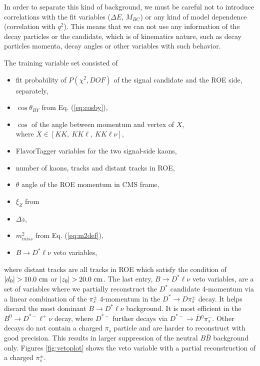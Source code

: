 In order to separate this kind of background, we must be careful not to introduce correlations with the fit variables ($\Delta E$, $M_{BC}$) or any kind of model dependence (correlation with $q^2$). This means that we can not use any information of the decay particles or the candidate, which is of kinematics nature, such as decay particles momenta, decay angles or other variables with such behavior.

The training variable set consisted of
\begin{itemize}
	\item fit probability of $P(\chi^2,DOF)$ of the signal candidate and the ROE side, separately,
	\item $\cos\theta_{BY}$ from Eq. (\ref{eq:cosby}),
	\item $\cos$ of the angle between momentum and vertex of $X$,\\where $X \in [KK,~KK\ell,~KK\ell\nu]$,
	\item FlavorTagger variables for the two signal-side kaons,
	\item number of kaons, tracks and distant tracks in ROE,
	\item $\theta$ angle of the ROE momentum in CMS frame,
	\item $\xi_Z$ from \cite{PhysRevD.83.032007}
	\item $\Delta z$,
	\item $m_{miss}^2$ from Eq. (\ref{eq:m2def}),
	\item $B \to D^* \ell \nu$ veto variables,
\end{itemize}
where distant tracks are all tracks in ROE which satisfy the condition of $\vert d_0 \vert  > 10.0\mathrm{~cm}$ or $\vert z_0 \vert > 20.0\mathrm{~cm}$. The last entry, $B \to D^* \ell \nu$ veto variables, are a set of variables where we partially reconstruct the $D^*$ candidate 4-momentum via a linear combination of the $\pi^\pm_s$ 4-momentum in the $D^* \to D \pi_s^\pm$ decay. It helps discard the most dominant $B \to D^* \ell \nu$ background. It is most efficient in the $B^0 \to D^{*-} \ell^+ \nu$ decay, where $D^{*-}$ further decays via $D^{*-} \to \bar D {}^0 \pi^-_s$. Other decays do not contain a charged $\pi_s$ particle and are harder to reconstruct with good precision. This results in larger suppression of the neutral $B \bar B$ background only. Figures \ref{fig:vetoplot} shows the veto variable with a partial reconstruction of a charged $\pi_s^\pm$.

